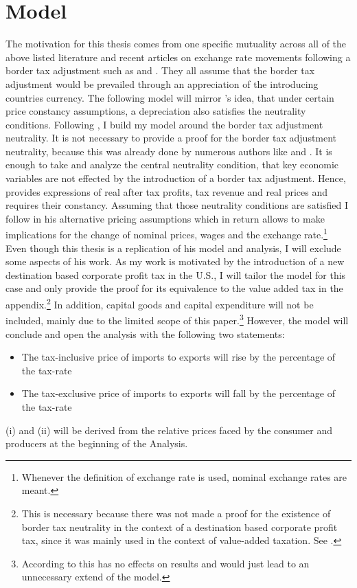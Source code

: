 \section{Model}

The motivation for this thesis comes from one specific mutuality across all of the above listed literature and recent articles on exchange rate movements following a border tax adjustment such as \cite{feldstein2017house} and \cite{auerbach2017destination}. They all assume that the border tax adjustment would be prevailed through an appreciation of the introducing countries currency. The following model will mirror \cite{buiter2017exchange}'s idea, that under certain price constancy assumptions, a depreciation also satisfies the neutrality conditions. 
Following \cite{buiter2017exchange}, I build my model around the border tax adjustment neutrality. It is not necessary to provide a proof for the border tax adjustment neutrality, because this was already done by numerous authors like \cite{Feldstein&Krugman} and \cite{grossman1980border}. It is enough to take and analyze the central neutrality condition, that key economic variables are not effected by the introduction of a border tax adjustment. Hence, \cite{buiter2017exchange} provides expressions of real after tax profits, tax revenue and real prices and requires their constancy. Assuming that those neutrality conditions are satisfied I follow \cite{buiter2017exchange} in his alternative pricing assumptions which in return allows to make implications for the change of nominal prices, wages and the exchange rate.\footnote{Whenever the definition of exchange rate is used, nominal exchange rates are meant.}
Even though this thesis is a replication of his model and analysis, I will exclude some aspects of his work. As my work is motivated by the introduction of a new destination based corporate profit tax in the U.S., I will tailor the model for this case and only provide the proof for its equivalence to the value added tax in the appendix.\footnote{This is necessary because there was not made a proof for the existence of border tax neutrality in the context of a destination based corporate profit tax, since it was mainly used in the context of value-added taxation. See \cite{Feldstein&Krugman}. } In addition, capital goods and capital expenditure will not be included, mainly due to the limited scope of this paper.\footnote{According to \cite{buiter2017exchange} this has no effects on results and would just lead to an unnecessary extend of the model.} 
However, the model will conclude and open the analysis with the following two statements: 
\begin{itemize}
    \item[(i)] The tax-inclusive price of imports to exports will rise by the percentage of the tax-rate
    \item[(ii)] The tax-exclusive price of imports to exports will fall by the percentage of the tax-rate
\end{itemize}
(i) and (ii) will be derived from the relative prices faced by the consumer and producers at the beginning of the Analysis.\\

